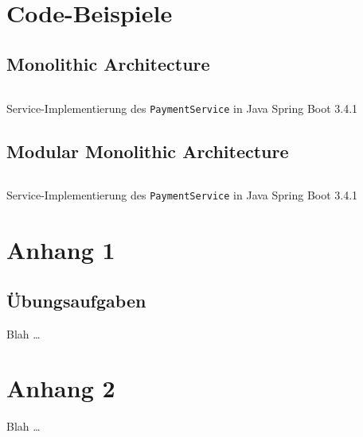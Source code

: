 \documentclass[acmtog]{acmart}
\begin{document}
\section{Code-Beispiele}

\subsection{Monolithic Architecture}
\label{app:code:monolith:paymentservice}
\begin{listing}[H]
    \tiny
    \inputminted[linenos=true]{java}{code/monolith/PaymentService.java}
    \caption{Service-Implementierung des \texttt{PaymentService} in Java Spring Boot 3.4.1}
\end{listing}

\subsection{Modular Monolithic Architecture}
\label{app:code:modulith:paymentservice}
\begin{listing}[H]
    \tiny
    \inputminted[linenos=true]{java}{code/modulith/PaymentService.java}
    \caption{Service-Implementierung des \texttt{PaymentService} in Java Spring Boot 3.4.1}
\end{listing}

\section{Anhang 1}

\subsection{Übungsaufgaben}
Blah \ldots

\section{Anhang 2}
Blah \ldots
\end{document}
